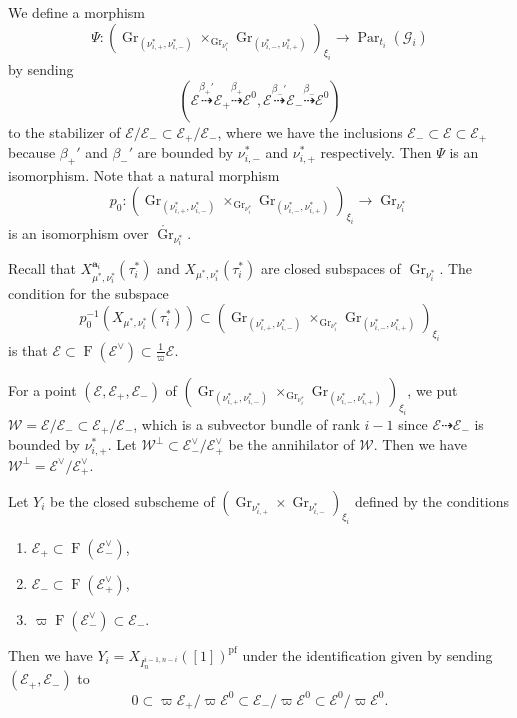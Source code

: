 \documentclass[12pt,a4paper]{article}
\DeclareMathOperator{\Gr}{Gr}
\DeclareMathOperator{\Par}{Par}
\DeclareMathOperator{\oF}{F}
\newcommand{\bfa}{\mathbf{a}}
\newcommand{\cE}{\mathcal{E}}
\newcommand{\sG}{\mathscr{G}}
\newcommand{\sW}{\mathscr{W}}
\begin{document}
We define a morphism 
\[
 \Psi \colon (\Gr_{(\nu_{i,+}^*,\nu_{i,-}^*)} \times_{\Gr_{\nu_i^*}}  \Gr_{(\nu_{i,-}^*,\nu_{i,+}^*)})_{\xi_i} \to 
  \Par_{t_i} (\sG_i) 
\]
by sending 
\[
 (\cE \stackrel{\beta_+'}{\dashrightarrow}
 \cE_+ \stackrel{\beta_+}{\dashrightarrow} \cE^0, \cE \stackrel{\beta_-'}{\dashrightarrow}
 \cE_- \stackrel{\beta_-}{\dashrightarrow} \cE^0)
\]
to the stabilizer of 
$\cE/\cE_- \subset \cE_+ / \cE_-$, 
where we have the inclusions $\cE_- \subset \cE \subset \cE_+$ 
because $\beta_+'$ and $\beta_-'$ are bounded by $\nu_{i,-}^*$ and $\nu_{i,+}^*$ respectively. 
Then $\Psi$ is an isomorphism. 
Note that a natural morphism 
\[
 p_0 \colon 
 (\Gr_{(\nu_{i,+}^*,\nu_{i,-}^*)} \times_{\Gr_{\nu_i^*}} \Gr_{(\nu_{i,-}^*,\nu_{i,+}^*)})_{\xi_i} \to \Gr_{\nu_i^*} 
\]
is an isomorphism over $\mathring{\Gr}_{\nu_i^*}$. 


Recall that 
$X_{\mu^*,\nu_i^*}^{\bfa_i}(\tau_i^*)$ 
and $X_{\mu^*,\nu_i^*}(\tau_i^*)$ 
are closed subspaces of 
$\Gr_{\nu_i^*}$. 
The condition for the subspace 
\[
 p_0^{-1} (X_{\mu^*,\nu_i^*}(\tau_i^*)) \subset (\Gr_{(\nu_{i,+}^*,\nu_{i,-}^*)} \times_{\Gr_{\nu_i^*}} \Gr_{(\nu_{i,-}^*,\nu_{i,+}^*)})_{\xi_i} 
\] 
is that 
$\cE \subset \oF (\cE^{\vee}) \subset \frac{1}{\varpi} \cE$. 

For a point $(\cE,\cE_+, \cE_-)$ of 
$(\Gr_{(\nu_{i,+}^*,\nu_{i,-}^*)} \times_{\Gr_{\nu_i^*}} \Gr_{(\nu_{i,-}^*,\nu_{i,+}^*)})_{\xi_i}$, 
we put $\sW=\cE/\cE_- \subset \cE_+ /\cE_-$, 
which is a subvector bundle of rank $i-1$ since $\cE \dashrightarrow
 \cE_-$ is bounded by $\nu_{i,+}^*$. 
Let $\sW^{\perp} \subset \cE_-^{\vee} /\cE_+^{\vee}$ be the annihilator of $\sW$. 
Then we have $\sW^{\perp}=\cE^{\vee}/\cE_+^{\vee}$. 

Let $Y_i$ be the closed subscheme of 
$(\Gr_{\nu_{i,+}^*} \times \Gr_{\nu_{i,-}^*})_{\xi_i}$ 
defined by the conditions 
\begin{enumerate}
\item 
$\cE_+ \subset \oF (\cE_-^{\vee})$, 
\item 
$\cE_- \subset \oF (\cE_+^{\vee})$, 
\item
$\varpi \oF (\cE_-^{\vee}) \subset \cE_-$. 
\end{enumerate}
Then we have $Y_i=X_{I_{n}^{i-1,n-i}}([1])^{\mathrm{pf}}$ under the identification given by sending 
$(\cE_+,\cE_-)$ to 
\[
 0 \subset \varpi\cE_+/\varpi \cE^0 \subset \cE_-/\varpi \cE^0 \subset \cE^0/\varpi \cE^0. 
\]
\end{document}
